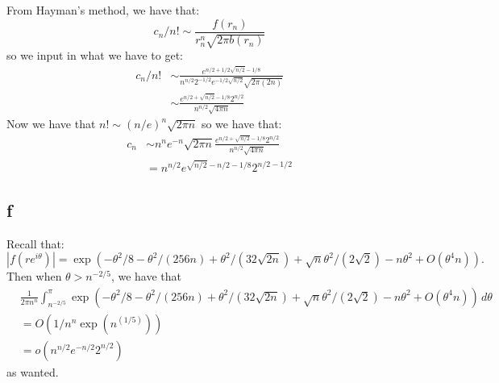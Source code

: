 \documentclass[]{article}
\begin{document}
From Hayman's method, we have that:
\begin{equation}
	c_n/n! \sim \frac{f(r_n)}{r_n^n \sqrt{2 \pi b(r_n)}}
\end{equation}
so we input in what we have to get:
\begin{align}
	c_n/n! &\sim \frac{e^{n/2 + 1/2 \sqrt{n/2} - 1/8}}{n^{n/2} 2^{-1/2} e^{-1/2 \sqrt{n/2}} \sqrt{2 \pi (2n)}}\\
	&\sim 
	\frac{e^{n/2 + \sqrt{n/2} - 1/8} 2^{n/2}}{n^{n/2} \sqrt{4 \pi n}}
\end{align}
Now we have that $n! \sim (n/e)^n \sqrt{2 \pi n}$ so we have that:
\begin{align}
	c_n &\sim n^n e^{-n} \sqrt{2 \pi n}\frac{e^{n/2 + \sqrt{n/2} - 1/8} 2^{n/2}}{n^{n/2} \sqrt{4 \pi n}}\\
	&=
	n^{n/2} e^{\sqrt{n/2} - n/2 - 1/8} 2^{n/2 - 1/2}
\end{align}


\subsection{f}
Recall that:
\begin{equation}
	|f(r e^{i \theta})| = \exp(
	-\theta^2/8 - \theta^2/(256n) + \theta^2/(32 \sqrt{2n}) + \sqrt{n} \theta^2/(2 \sqrt{2}) - n \theta^2 + O(\theta^4 n)
	).
\end{equation}
Then when $\theta > n^{-2/5}$, we have that 
\begin{align*}
	&\frac{1}{2 \pi n^n} \int^\pi_{n^{-2/5}} \exp(
	-\theta^2/8 - \theta^2/(256n) + \theta^2/(32 \sqrt{2n}) + \sqrt{n} \theta^2/(2 \sqrt{2}) - n \theta^2 + O(\theta^4 n)
	) \, d\theta \\
	&= O(1/n^n \exp(n^(1/5)))\\
	&= o(n^{n/2} e^{-n/2} 2^{n/2})
\end{align*}
as wanted. 
\end{document}
